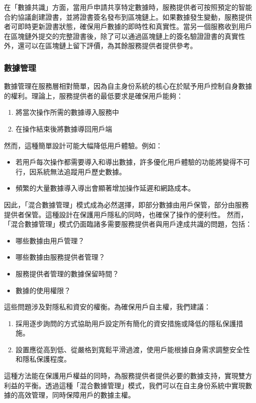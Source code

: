 在「數據共識」方面，當用戶申請共享特定數據時，服務提供者可按照預定的智能合約協議創建證書，並將證書簽名發布到區塊鏈上。如果數據發生變動，服務提供者可即時更新證書狀態，確保用戶數據的即時性和真實性。當另一個服務收到用戶在區塊鏈外提交的完整證書後，除了可以通過區塊鏈上的簽名驗證證書的真實性外，還可以在區塊鏈上留下評價，為其餘服務提供者提供參考。
\subsubsection{數據管理}
數據管理在服務層相對簡單，因為自主身份系統的核心在於賦予用戶控制自身數據的權利。理論上，服務提供者的最低要求是確保用戶能夠：
\begin{enumerate}
  \item 將當次操作所需的數據導入服務中
  \item 在操作結束後將數據導回用戶端
\end{enumerate}
然而，這種簡單設計可能大幅降低用戶體驗。例如：
\begin{itemize}
  \item 若用戶每次操作都需要導入和導出數據，許多優化用戶體驗的功能將變得不可行，因系統無法追蹤用戶歷史數據。
  \item 頻繁的大量數據導入導出會顯著增加操作延遲和網路成本。
\end{itemize}
因此，「混合數據管理」模式成為必然選擇，即部分數據由用戶保管，部分由服務提供者保管。這種設計在保護用戶隱私的同時，也確保了操作的便利性。
然而，「混合數據管理」模式仍面臨諸多需要服務提供者與用戶達成共識的問題，包括：
\begin{itemize}
  \item 哪些數據由用戶管理？
  \item 哪些數據由服務提供者管理？
  \item 服務提供者管理的數據保留時間？
  \item 數據的使用權限？
\end{itemize}
這些問題涉及對隱私和資安的權衡。為確保用戶自主權，我們建議：
\begin{enumerate}
  \item 採用逐步詢問的方式協助用戶設定所有簡化的資安措施或降低的隱私保護措施。
  \item 設置應從高到低、從嚴格到寬鬆平滑過渡，使用戶能根據自身需求調整安全性和隱私保護程度。
\end{enumerate}
這種方法能在保護用戶權益的同時，為服務提供者提供必要的數據支持，實現雙方利益的平衡。透過這種「混合數據管理」模式，我們可以在自主身份系統中實現數據的高效管理，同時保障用戶的數據主權。
